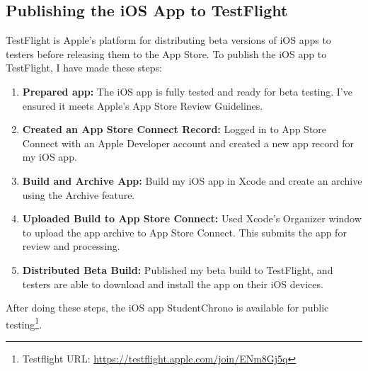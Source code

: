 \documentclass[
  biblatex = false,
  language=english,
  figures=false,
  sourcecodes,
  glossaries,
  index
]{kidiplom}
\begin{document}
\subsection{Publishing the iOS App to TestFlight}

TestFlight is Apple's platform for distributing beta versions of iOS apps to testers before releasing them to the App Store. To publish the iOS app to TestFlight, I have made these steps:

\begin{enumerate}
    \item \textbf{Prepared app:} The iOS app is fully tested and ready for beta testing. I've ensured it meets Apple's App Store Review Guidelines.
    \item \textbf{Created an App Store Connect Record:} Logged in to App Store Connect with an Apple Developer account and created a new app record for my iOS app.
    \item \textbf{Build and Archive App:} Build my iOS app in Xcode and create an archive using the Archive feature.    
    \item \textbf{Uploaded Build to App Store Connect:} Used Xcode's Organizer window to upload the app archive to App Store Connect. This submits the app for review and processing.
    \item \textbf{Distributed Beta Build:} Published my beta build to TestFlight, and testers are able to download and install the app on their iOS devices.
 \end{enumerate}
 
After doing these steps, the iOS app StudentChrono is available for public testing\footnote{Testflight URL: \url{https://testflight.apple.com/join/ENm8Gj5q}}.
\end{document}
